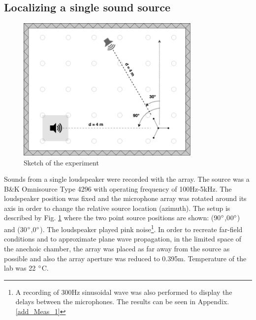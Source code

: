 \subsection{Localizing a single sound source}





\begin{figure}[H]
    \centering
    \includegraphics[width=0.8\textwidth]{Figures/Anechoicexp1.png}
    \caption{Sketch of the experiment}
    \label{fig:Anechoic1}
\end{figure}

Sounds from a single loudspeaker were recorded with the array. The source was a B\&K Omnisource Type 4296 with operating frequency of 100Hz-5kHz. The loudspeaker position was fixed and the microphone array was rotated around its axis in order to change the relative source location (azimuth). The setup is described by Fig. \ref{fig:Anechoic1} where the two point source positions are shown: (90$\degree$,0$0\degree$) and (30$\degree$,0$\degree$). The loudspeaker played pink noise\footnote{A recording of 300Hz sinusoidal wave was also performed to display the delays between the microphones. The results can be seen in Appendix. \ref{add_Meas_1}}. In order to recreate far-field conditions and to approximate plane wave propagation, in the limited space of the anechoic chamber, the array was placed as far away from the source as possible and also the array aperture was reduced to 0.395m. Temperature of the lab was 22 $\degree$C.



